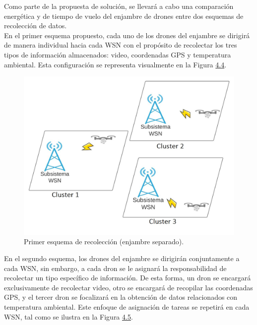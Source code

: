 \noindent Como parte de la propuesta de solución, se llevará a cabo una comparación energética y de tiempo de vuelo del enjambre de drones entre dos esquemas de recolección de datos.\\
En el primer esquema propuesto, cada uno de los drones del enjambre se dirigirá de manera individual hacia cada WSN con el propósito de recolectar los tres tipos de información almacenados: video, coordenadas GPS y temperatura ambiental. Esta configuración se representa visualmente en la Figura \hyperref[figura5]{4.4}.
\begin{figure}[h]
    \centering
    \includegraphics[width=0.5\linewidth]{imagenes/img5_recoleccion_enajmbre.jpg}
    \caption{Primer esquema de recolección (enjambre separado).}
    \label{figura5}
\end{figure}
\newpage
\noindent En el segundo esquema, los drones del enjambre se dirigirán conjuntamente a cada WSN, sin embargo, a cada dron se le asignará la responsabilidad de recolectar un tipo específico de información. De esta forma, un dron se encargará exclusivamente de recolectar video, otro se encargará de recopilar las coordenadas GPS, y el tercer dron se focalizará en la obtención de datos relacionados con temperatura ambiental. Este enfoque de asignación de tareas se repetirá en cada WSN, tal como se ilustra en la Figura \hyperref[figura6]{4.5}.

